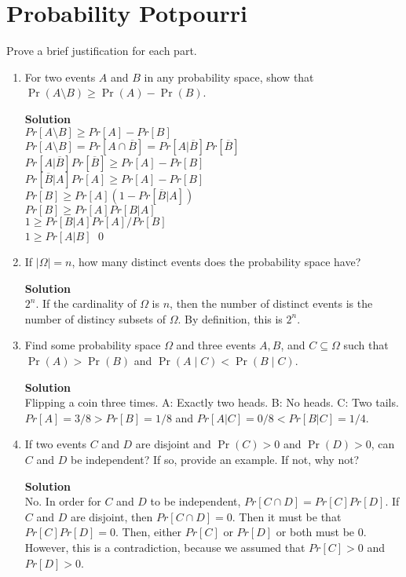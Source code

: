 \documentclass[11pt]{article}
\newcommand*{\Question}[1]{\section{#1}}
\newenvironment{Parts}{\begin{enumerate}[label=(\alph*)]}{\end{enumerate}}
\newcommand*{\Part}{\item}
\begin{document}


\Question{Probability Potpourri}

Prove a brief justification for each part.

\begin{Parts}

\Part For two events $A$ and $B$ in any probability space, show that $\Pr(A \setminus B) \geq \Pr(A) - \Pr(B)$.
\begin{mdframed} \textbf{Solution} \\
$Pr[A \setminus B] \geq Pr[A]-Pr[B]$ \\
$Pr[A \setminus B]=Pr[A \cap \overline{B}]=Pr[A|\overline{B}]Pr[\overline{B}]$ \\
$Pr[A|\overline{B}]Pr[\overline{B}] \geq Pr[A]-Pr[B]$ \\
$Pr[\overline{B}|A]Pr[A] \geq Pr[A]-Pr[B]$ \\
$Pr[B] \geq Pr[A](1-Pr[\overline{B}|A])$ \\
$Pr[B] \geq Pr[A]Pr[B|A]$ \\
$1 \geq Pr[B|A]Pr[A]/Pr[B]$ \\
$1 \geq Pr[A|B]$ \qed 
\end{mdframed}

\Part If $|\Omega| = n$, how many distinct events does the probability space have?
\begin{mdframed} \textbf{Solution} \\
$2^n$. If the cardinality of $\Omega$ is $n$, then the number of distinct events is the number of distincy subsets of $\Omega$. By definition, this is $2^n$.
\end{mdframed}

\Part Find some probability space $\Omega$ and three events $A, B$, and $C \subseteq \Omega$ such that $\Pr(A) > \Pr(B)$ and $\Pr(A \mid C) < \Pr(B \mid C)$.
\begin{mdframed} \textbf{Solution} \\
Flipping a coin three times. A: Exactly two heads. B: No heads. C: Two tails. \\
$Pr[A]=3/8>Pr[B]=1/8$ and $Pr[A|C]=0/8<Pr[B|C]=1/4$. 
\end{mdframed}

\Part If two events $C$ and $D$ are disjoint and $\Pr(C) > 0$ and $\Pr(D) > 0$, can $C$ and $D$ be independent? If so, provide an example. If not, why not?
\begin{mdframed} \textbf{Solution} \\
No. In order for $C$ and $D$ to be independent, $Pr[C \cap D]=Pr[C]Pr[D]$. If $C$ and $D$ are disjoint, then $Pr[C \cap D]=0$. Then it must be that $Pr[C]Pr[D]=0$. Then, either $Pr[C]$ or $Pr[D]$ or both must be 0. However, this is a contradiction, because we assumed that $Pr[C]>0$ and $Pr[D]>0$. 
\end{mdframed}


\end{Parts}
\end{document}
